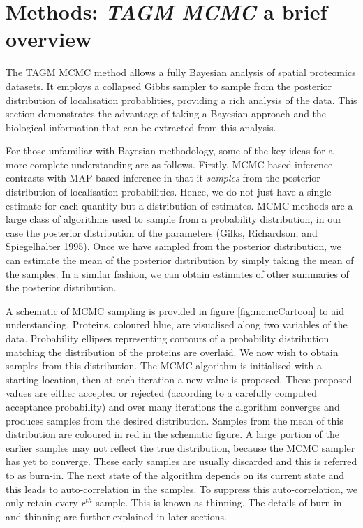 \documentclass[]{article}
\begin{document}
\section{\texorpdfstring{Methods: \emph{TAGM MCMC} a brief
overview}{Methods: TAGM MCMC a brief overview}}\label{methods-tagm-mcmc-a-brief-overview}

The TAGM MCMC method allows a fully Bayesian analysis of spatial
proteomics datasets. It employs a collapsed Gibbs sampler to sample from
the posterior distribution of localisation probablities, providing a
rich analysis of the data. This section demonstrates the advantage of
taking a Bayesian approach and the biological information that can be
extracted from this analysis.

For those unfamiliar with Bayesian methodology, some of the key ideas
for a more complete understanding are as follows. Firstly, MCMC based
inference contrasts with MAP based inference in that it \textit{samples}
from the posterior distribution of localisation probabilities. Hence, we
do not just have a single estimate for each quantity but a distribution
of estimates. MCMC methods are a large class of algorithms used to
sample from a probability distribution, in our case the posterior
distribution of the parameters (Gilks, Richardson, and Spiegelhalter
1995). Once we have sampled from the posterior distribution, we can
estimate the mean of the posterior distribution by simply taking the
mean of the samples. In a similar fashion, we can obtain estimates of
other summaries of the posterior distribution.

A schematic of MCMC sampling is provided in figure \ref{fig:mcmcCartoon}
to aid understanding. Proteins, coloured blue, are visualised along two
variables of the data. Probability ellipses representing contours of a
probability distribution matching the distribution of the proteins are
overlaid. We now wish to obtain samples from this distribution. The MCMC
algorithm is initialised with a starting location, then at each
iteration a new value is proposed. These proposed values are either
accepted or rejected (according to a carefully computed acceptance
probability) and over many iterations the algorithm converges and
produces samples from the desired distribution. Samples from the mean of
this distribution are coloured in red in the schematic figure. A large
portion of the earlier samples may not reflect the true distribution,
because the MCMC sampler has yet to converge. These early samples are
usually discarded and this is referred to as burn-in. The next state of
the algorithm depends on its current state and this leads to
auto-correlation in the samples. To suppress this auto-correlation, we
only retain every \(r^{th}\) sample. This is known as thinning. The
details of burn-in and thinning are further explained in later sections.
\end{document}
